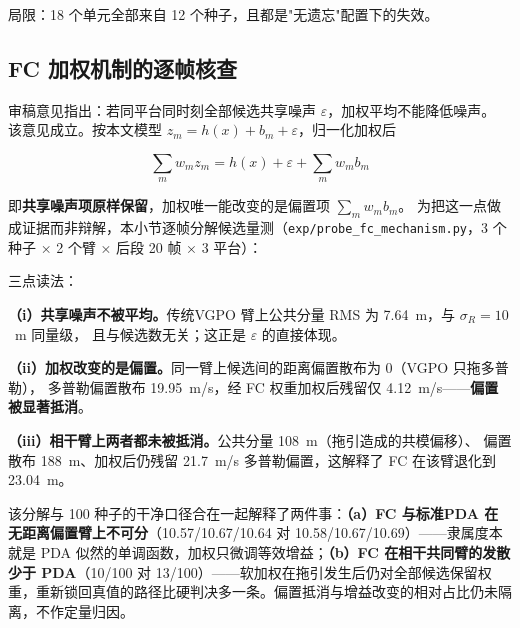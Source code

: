 \documentclass[UTF8,a4paper,zihao=-4]{ctexart}
\begin{document}
局限：18 个单元全部来自 12 个种子，且都是"无遗忘"配置下的失效。

\subsection{FC 加权机制的逐帧核查}\label{sup:fc-mech}

审稿意见指出：若同平台同时刻全部候选共享噪声 $\varepsilon$，加权平均不能降低噪声。
该意见成立。按本文模型 $z_m=h(x)+b_m+\varepsilon$，归一化加权后

\[\sum_m w_m z_m=h(x)+\varepsilon+\sum_m w_m b_m\]

即\textbf{共享噪声项原样保留}，加权唯一能改变的是偏置项 $\sum_m w_m b_m$。
为把这一点做成证据而非辩解，本小节逐帧分解候选量测（\texttt{exp/probe\_fc\_mechanism.py}，3 个种子 × 2 个臂 × 后段 20 帧 × 3 平台）：

\begin{table}[htbp]\centering\small
\caption{加权量测的分解（RMS，单位与量测同；距离为 m、多普勒为 m/s）}\label{tab:fc-mech}
\end{table}

三点读法：

\textbf{（i）共享噪声不被平均。}传统VGPO 臂上公共分量 RMS 为 7.64~m，与 $\sigma_R=10$~m 同量级，
且与候选数无关；这正是 $\varepsilon$ 的直接体现。

\textbf{（ii）加权改变的是偏置。}同一臂上候选间的距离偏置散布为 0（VGPO 只拖多普勒），
多普勒偏置散布 19.95~m/s，经 FC 权重加权后残留仅 4.12~m/s——\textbf{偏置被显著抵消}。

\textbf{（iii）相干臂上两者都未被抵消。}公共分量 108~m（拖引造成的共模偏移）、
偏置散布 188~m、加权后仍残留 21.7~m/s 多普勒偏置，这解释了 FC 在该臂退化到 23.04~m。

该分解与 100 种子的干净口径合在一起解释了两件事：\textbf{（a）FC 与标准PDA 在无距离偏置臂上不可分}（10.57/10.67/10.64 对 10.58/10.67/10.69）——隶属度本就是 PDA 似然的单调函数，加权只微调等效增益；\textbf{（b）FC 在相干共同臂的发散少于 PDA}（10/100 对 13/100）——软加权在拖引发生后仍对全部候选保留权重，重新锁回真值的路径比硬判决多一条。偏置抵消与增益改变的相对占比仍未隔离，不作定量归因。
\end{document}
